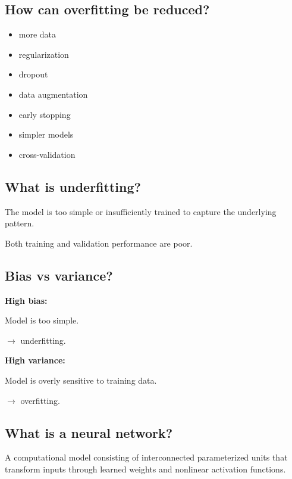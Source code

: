 \medskip

\subsection{How can overfitting be reduced?}

\begin{itemize}
  \item more data
  \item regularization
  \item dropout
  \item data augmentation
  \item early stopping
  \item simpler models
  \item cross-validation
\end{itemize}

\medskip

\subsection{What is underfitting?}

The model is too simple or insufficiently trained to capture the underlying pattern.

Both training and validation performance are poor.

\medskip

\subsection{Bias vs variance?}

\textbf{High bias:}

Model is too simple.

$\rightarrow$ underfitting.

\textbf{High variance:}

Model is overly sensitive to training data.

$\rightarrow$ overfitting.

\medskip

\subsection{What is a neural network?}

A computational model consisting of interconnected parameterized units that transform inputs through learned weights and nonlinear activation functions.

\medskip

